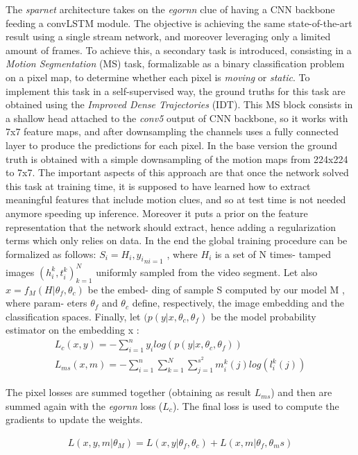 \documentclass[10pt,twocolumn,hidelinks,letterpaper]{article}
\begin{document}
The \textit{sparnet} architecture takes on the \textit{egornn} clue of having a CNN backbone feeding a convLSTM module. The objective is achieving the same state-of-the-art result using a single stream network, and moreover leveraging only a limited amount of frames. To achieve this, a secondary task is introduced, consisting in a \textit{Motion Segmentation} (MS) task, formalizable as a binary classification problem on a pixel map, to determine whether each pixel is \textit{moving} or \textit{static}. To implement this task in a self-supervised way, the ground truths for this task are obtained using the \textit{Improved Dense Trajectories} (IDT). This MS block consists in a shallow head attached to the \textit{conv5} output of CNN backbone, so it works with 7x7 feature maps, and after downsampling the channels uses a fully connected layer to produce the predictions for each pixel. In the base version the ground truth is obtained with a simple downsampling of the motion maps from 224x224 to 7x7.
The important aspects of this approach are that once the network solved this task at training time, it is supposed to have learned how to extract meaningful features that include motion clues, and so at test time is not needed anymore speeding up inference. Moreover it puts a prior on the feature representation that the network should extract, hence adding a regularization terms which only relies on data. In the end the global training procedure can be formalized as follows:
$S_i = {H_i , y_i }_{ni=1}$ , where $H_i$ is a set of N times-
tamped images ${(h^k_i , t^k_i )}_{k=1}^N$
uniformly sampled from the
video segment. Let also $x = f_M(H|\theta_f , \theta_c )$ be the embed-
ding of sample S computed by our model M , where param-
eters $\theta_f$ and $\theta_c$ define, respectively, the image embedding
and the classification spaces. Finally, let $(p(y|x, \theta_c, \theta_f)$ be the
model probability estimator on the embedding x :
\begin{align*}
L_c(x,y) = - \sum_{i=1}^{n} y_i log(p(y|x, \theta_c, \theta_f))\\
L_{ms}(x,m) = - \sum_{i=1}^{n} \sum_{k=1}^{N} \sum_{j=1}^{s^2} m_i^k(j)log(l_i^k(j))
\end{align*}

The pixel losses are summed together (obtaining as result $L_{ms}$) and then are summed again with the \textit{egornn} loss ($L_c$). The final loss is used to compute the gradients to update the weights.

\begin{align*}
L(x,y,m| \theta_M) = L(x,y|\theta_f, \theta_c) + L(x,m| \theta_f, \theta_ms )
\end{align*}
\end{document}

